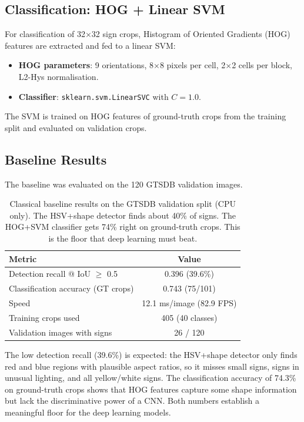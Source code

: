 \documentclass[12pt,a4paper]{article}
\begin{document}
\subsection{Classification: HOG + Linear SVM}

For classification of 32$\times$32 sign crops, Histogram of Oriented Gradients (HOG) features are extracted and fed to a linear SVM:
\begin{itemize}[leftmargin=2em, itemsep=2pt]
  \item \textbf{HOG parameters}: 9 orientations, 8$\times$8 pixels per cell, 2$\times$2 cells per block, L2-Hys normalisation.
  \item \textbf{Classifier}: \texttt{sklearn.svm.LinearSVC} with $C = 1.0$.
\end{itemize}

The SVM is trained on HOG features of ground-truth crops from the training split and evaluated on validation crops.

\subsection{Baseline Results}

The baseline was evaluated on the 120 GTSDB validation images.

\begin{table}[H]
\centering
\renewcommand{\arraystretch}{1.3}
\begin{tabular}{lc}
\toprule
\textbf{Metric} & \textbf{Value} \\
\midrule
Detection recall @ IoU $\geq$ 0.5   & 0.396 (39.6\%) \\
Classification accuracy (GT crops)  & 0.743 (75/101) \\
Speed                               & 12.1 ms/image (82.9 FPS) \\
\midrule
Training crops used                 & 405 (40 classes) \\
Validation images with signs        & 26 / 120 \\
\bottomrule
\end{tabular}
\caption{Classical baseline results on the GTSDB validation split (CPU only). The HSV+shape detector finds about 40\% of signs. The HOG+SVM classifier gets 74\% right on ground-truth crops. This is the floor that deep learning must beat.}
\label{tab:baseline}
\end{table}

\begin{notebox}
The low detection recall (39.6\%) is expected: the HSV+shape detector only finds red and blue regions with plausible aspect ratios, so it misses small signs, signs in unusual lighting, and all yellow/white signs. The classification accuracy of 74.3\% on ground-truth crops shows that HOG features capture some shape information but lack the discriminative power of a CNN. Both numbers establish a meaningful floor for the deep learning models.
\end{notebox}
\end{document}
